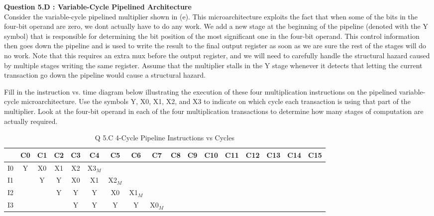 \documentclass[a4paper,11pt]{article}
\begin{document}
\item \textbf{Question 5.D : Variable-Cycle Pipelined Architecture} \\ 
  Consider the variable-cycle pipelined multiplier shown in (e). This microarchitecture exploits the fact that when some of the bits in the four-bit operand are zero, we dont actually have to do any work. We add a new stage at the beginning of the pipeline (denoted with the Y symbol) that is responsible for determining the bit position of the most significant one in the four-bit operand. This control information then goes down the pipeline and is used to write the result to the final output register as soon as we are sure the rest of the stages will do no work. Note that this requires an extra mux before the output register, and we will need to carefully handle the structural hazard caused by multiple stages writing the same register. Assume that the multiplier stalls in the Y stage whenever it detects that letting the current transaction go down the pipeline would cause a structural hazard.

Fill in the instruction vs. time diagram below illustrating the execution of these four multiplication instructions on the pipelined variable-cycle microarchitecture. Use the symbols Y, X0, X1, X2, and X3 to indicate on which cycle each transaction is using that part of the multiplier. Look at the four-bit operand in each of the four multiplication transactions to determine how many stages of computation are actually required.

\begin{table}[H]
\caption{Q 5.C 4-Cycle Pipeline Instructions vs Cycles}
\begin{center}
\begin{tabular}{|c|c|c|c|c|c|c|c|c|c|c|c|c|c|c|c|c|} \hline
     & C0 & C1 & C2 & C3 & C4     & C5      & C6     & C7     & C8 & C9 & C10 & C11 & C12 & C13 & C14 & C15  \\ \hline
  I0 & Y  & X0 & X1 & X2 & X3$_M$ &         &        &        &    &     &     &     &     &     &    &      \\ \hline   
  I1 &    & Y  & Y  & X0 & X1     & X2$_M$  &        &        &    &     &     &     &     &     &    &      \\ \hline   
  I2 &    &    & Y  & Y  & Y      & X0      & X1$_M$ &        &    &     &     &     &     &     &    &      \\ \hline   
  I3 &    &    &    & Y  & Y      & Y       &  Y     & X0$_M$ &    &     &     &     &     &     &    &      \\ \hline   
\end{tabular}
\end{center}
\end{table}
\end{document}
